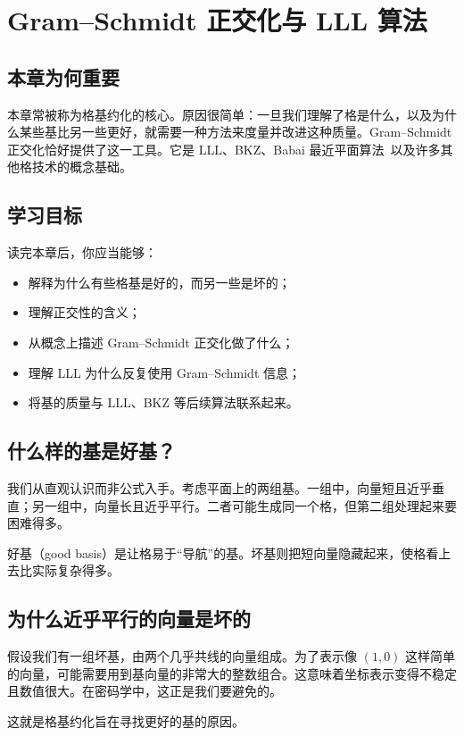 \chapter{Gram--Schmidt 正交化与 LLL 算法}
\label{ch:lll}

\section{本章为何重要}
本章常被称为格基约化的核心。原因很简单：一旦我们理解了格是什么，以及为什么某些基比另一些更好，就需要一种方法来度量并改进这种质量。Gram--Schmidt 正交化恰好提供了这一工具。它是 LLL、BKZ、Babai 最近平面算法~\cite{babai1986}以及许多其他格技术的概念基础。

\section{学习目标}
读完本章后，你应当能够：

\begin{itemize}
  \item 解释为什么有些格基是好的，而另一些是坏的；
  \item 理解正交性的含义；
  \item 从概念上描述 Gram--Schmidt 正交化做了什么；
  \item 理解 LLL 为什么反复使用 Gram--Schmidt 信息；
  \item 将基的质量与 LLL、BKZ 等后续算法联系起来。
\end{itemize}

\section{什么样的基是好基？}
我们从直观认识而非公式入手。考虑平面上的两组基。一组中，向量短且近乎垂直；另一组中，向量长且近乎平行。二者可能生成同一个格，但第二组处理起来要困难得多。

好基（good basis）是让格易于“导航”的基。坏基则把短向量隐藏起来，使格看上去比实际复杂得多。

\section{为什么近乎平行的向量是坏的}
假设我们有一组坏基，由两个几乎共线的向量组成。为了表示像 $(1,0)$ 这样简单的向量，可能需要用到基向量的非常大的整数组合。这意味着坐标表示变得不稳定且数值很大。在密码学中，这正是我们要避免的。

这就是格基约化旨在寻找更好的基的原因。

